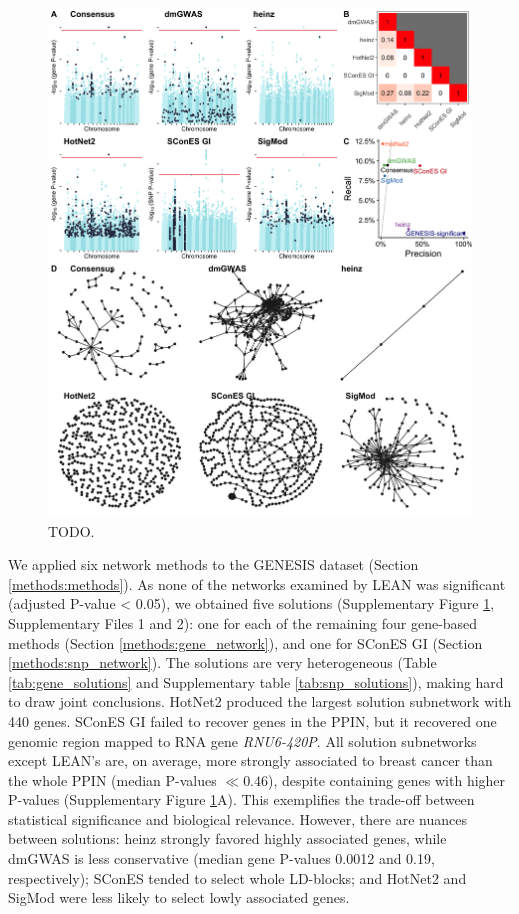 \documentclass[twocolumn, 10pt]{article}
\begin{document}
\begin{figure}[htbp]
  \centering
  \includegraphics[width=.9\linewidth]{./figures/figure_1.png}
  \caption{\label{fig:solution_overview} TODO.}
\end{figure}

We applied six network methods to the GENESIS dataset (Section \ref{methods:methods}). As none of the networks examined by LEAN was significant (adjusted P-value < 0.05), we obtained five solutions (Supplementary Figure \ref{fig:solution_overview}, Supplementary Files 1 and 2): one for each of the remaining four gene-based methods (Section \ref{methods:gene_network}), and one for SConES GI (Section \ref{methods:snp_network}). The solutions are very heterogeneous (Table \ref{tab:gene_solutions} and Supplementary table \ref{tab:snp_solutions}), making hard to draw joint conclusions. HotNet2 produced the largest solution subnetwork with 440 genes. SConES GI failed to recover genes in the PPIN, but it recovered one genomic region mapped to RNA gene \emph{RNU6-420P}. All solution subnetworks except LEAN's are, on average, more strongly associated to breast cancer than the whole PPIN (median P-values $\ll 0.46$), despite containing genes with higher P-values (Supplementary Figure \ref{fig:solution_overview}A). This exemplifies the trade-off between statistical significance and biological relevance. However, there are nuances between solutions: heinz strongly favored highly associated genes, while dmGWAS is less conservative (median gene P-values 0.0012 and 0.19, respectively); SConES tended to select whole LD-blocks; and HotNet2 and SigMod were less likely to select lowly associated genes. 
\end{document}
